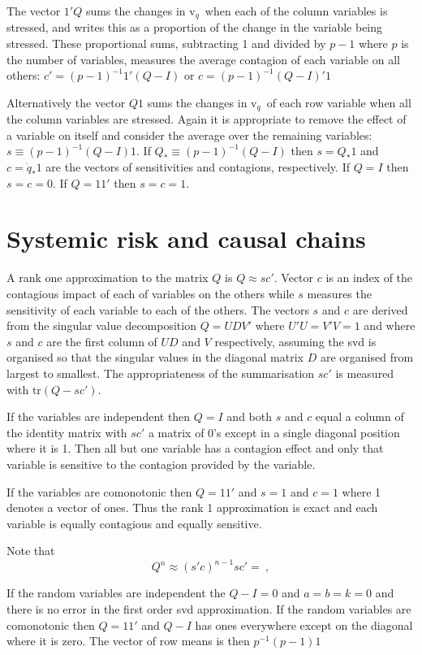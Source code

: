\documentclass[authoryear]{elsarticle}
\newcommand{\tr}{\mathrm{tr}}
\renewcommand{\v}{\ensuremath{\mathrm{v}_q}}
\begin{document}
The vector $1'Q$ sums  the changes in \v\ when each of the column variables is stressed, and writes this as a proportion of the change in the variable being stressed.   These proportional sums, subtracting 1 and divided by  $p-1$ where $p$ is the number of variables, measures the average contagion of each variable on all others:  $c'=(p-1)^{-1}1'(Q-I)$ or $c=(p-1)^{-1}(Q-I)'1$

Alternatively the vector $Q1$ sums the changes in \v\ of each row variable when all the column variables are stressed.   Again it is appropriate to remove the effect of a variable on itself and consider the average over the remaining variables:  $s\equiv(p-1)^{-1}(Q-I)1$.  If $Q_*\equiv (p-1)^{-1}(Q-I)$ then $s=Q_*1$ and $c=\dot q_*1$ are the vectors of sensitivities and contagions, respectively.  If $Q=I$ then $s=c=0$.   If $Q=11'$ then $s=c=1$.



 
 \section{Systemic risk and causal chains}
A rank one approximation to the matrix  $Q$ is 
 $
 Q  \approx  sc' 
 $.
 Vector $c$ is an index of the contagious  impact of each of variables on the others while $s$ measures the sensitivity of each variable to each of the others.  The vectors $s$ and $c$ are derived from the singular value decomposition $Q=UDV'$ where $U'U=V'V=1$  and  where $s$ and $c$ are the first column of $UD$ and $V$  respectively, assuming the svd is organised so that the singular values in the diagonal matrix $D$ are organised from largest to smallest.   The appropriateness of the summarisation $sc'$ is measured with $\tr(Q-sc')$.
 
If the variables are independent then $Q=I$ and both $s$ and $c$ equal a column of the identity matrix with $sc'$ a matrix of 0's except in a single diagonal position where it is 1.   Then all but one variable has a contagion effect and only that variable is sensitive to the contagion provided by the  variable.

If the variables are comonotonic then $Q=11'$ and $s=1$ and $c=1$ where 1 denotes a vector of ones.   Thus the rank 1 approximation is exact and each variable is equally contagious and equally sensitive.
 
 Note that 
 $$
 Q^{n} \approx (s'c)^{n-1}sc'=\ ,
 $$
 
 
 If the random variables are independent the $Q-I=0$ and $a=b=k=0$ and there is no error in the first order svd approximation.    If the random variables are comonotonic then $Q=11'$ and $Q-I$ has ones everywhere except on the diagonal where it is zero.   The vector of row means is then $p^{-1}(p-1)1$
 
\end{document}
